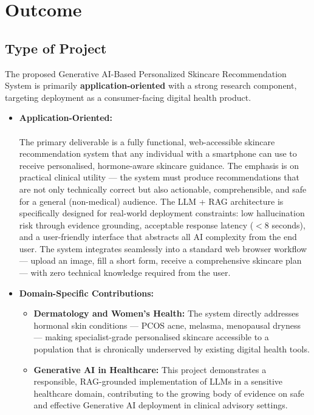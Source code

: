 \chapter{Outcome}
\section{Type of Project}
The proposed Generative AI-Based Personalized Skincare Recommendation System is primarily \textbf{application-oriented} with a strong research component, targeting deployment as a consumer-facing digital health product.

\begin{itemize}
\vspace{0.5cm}
    \item \textbf{Application-Oriented:}\\
    \\\hspace*{0.5in}The primary deliverable is a fully functional, web-accessible skincare recommendation system that any individual with a smartphone can use to receive personalised, hormone-aware skincare guidance. The emphasis is on practical clinical utility — the system must produce recommendations that are not only technically correct but also actionable, comprehensible, and safe for a general (non-medical) audience. The LLM + RAG architecture is specifically designed for real-world deployment constraints: low hallucination risk through evidence grounding, acceptable response latency ($< 8$ seconds), and a user-friendly interface that abstracts all AI complexity from the end user. The system integrates seamlessly into a standard web browser workflow — upload an image, fill a short form, receive a comprehensive skincare plan — with zero technical knowledge required from the user.\\

    \item \textbf{Domain-Specific Contributions:}
    \vspace{0.5cm}
    \begin{itemize}[label=$\diamond$]
    \item \textbf{Dermatology and Women's Health:} The system directly addresses hormonal skin conditions — PCOS acne, melasma, menopausal dryness — making specialist-grade personalised skincare accessible to a population that is chronically underserved by existing digital health tools.

    \item \textbf{Generative AI in Healthcare:} This project demonstrates a responsible, RAG-grounded implementation of LLMs in a sensitive healthcare domain, contributing to the growing body of evidence on safe and effective Generative AI deployment in clinical advisory settings.


\end{itemize}
\end{itemize}
